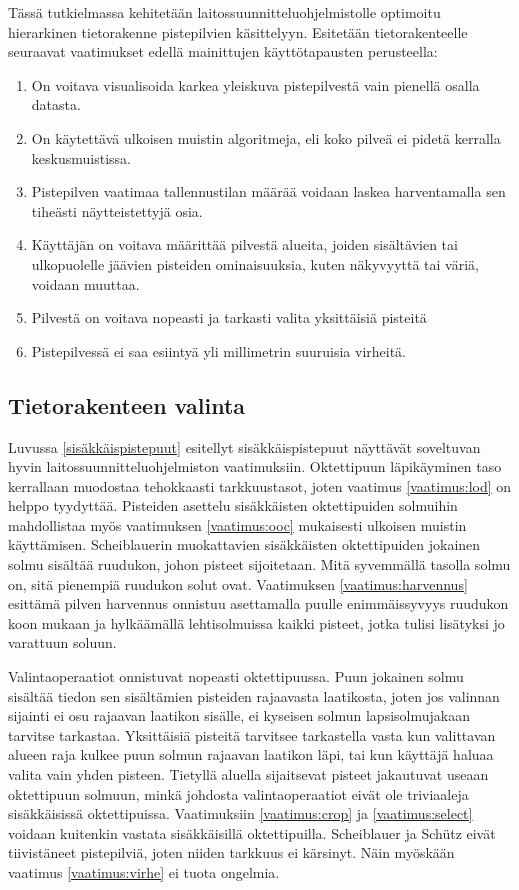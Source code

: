 Tässä tutkielmassa kehitetään laitossuunnitteluohjelmistolle optimoitu hierarkinen tietorakenne pistepilvien käsittelyyn. Esitetään tietorakenteelle seuraavat vaatimukset edellä mainittujen käyttötapausten perusteella:
\begin{enumerate}
    \item \label{vaatimus:lod} On voitava visualisoida karkea yleiskuva pistepilvestä vain pienellä osalla datasta. 
    \item \label{vaatimus:ooc} On käytettävä ulkoisen muistin algoritmeja, eli koko pilveä ei pidetä kerralla keskusmuistissa.
    \item \label{vaatimus:harvennus} Pistepilven vaatimaa tallennustilan määrää voidaan laskea harventamalla sen tiheästi näytteistettyjä osia. 
    \item \label{vaatimus:crop} Käyttäjän on voitava määrittää pilvestä alueita, joiden sisältävien tai ulkopuolelle jäävien pisteiden ominaisuuksia, kuten näkyvyyttä tai väriä, voidaan muuttaa.
    \item \label{vaatimus:select} Pilvestä on voitava nopeasti ja tarkasti valita yksittäisiä pisteitä
    \item \label{vaatimus:virhe} Pistepilvessä ei saa esiintyä yli millimetrin suuruisia virheitä.
\end{enumerate}


\subsection{Tietorakenteen valinta}

Luvussa \ref{sisäkkäispistepuut} esitellyt sisäkkäispistepuut näyttävät soveltuvan hyvin laitossuunnitteluohjelmiston vaatimuksiin. Oktettipuun läpikäyminen taso kerrallaan muodostaa tehokkaasti tarkkuustasot, joten vaatimus \ref{vaatimus:lod} on helppo tyydyttää. Pisteiden asettelu sisäkkäisten oktettipuiden solmuihin mahdollistaa myös vaatimuksen \ref{vaatimus:ooc} mukaisesti ulkoisen muistin käyttämisen. Scheiblauerin muokattavien sisäkkäisten oktettipuiden jokainen solmu sisältää ruudukon, johon pisteet sijoitetaan. Mitä syvemmällä tasolla solmu on, sitä pienempiä ruudukon solut ovat. Vaatimuksen \ref{vaatimus:harvennus} esittämä pilven harvennus onnistuu asettamalla puulle enimmäissyvyys ruudukon koon mukaan ja hylkäämällä lehtisolmuissa kaikki pisteet, jotka tulisi lisätyksi jo varattuun soluun. 

Valintaoperaatiot onnistuvat nopeasti oktettipuussa. Puun jokainen solmu sisältää tiedon sen sisältämien pisteiden rajaavasta laatikosta, joten jos valinnan sijainti ei osu rajaavan laatikon sisälle, ei kyseisen solmun lapsisolmujakaan tarvitse tarkastaa. Yksittäisiä pisteitä tarvitsee tarkastella vasta kun valittavan alueen raja kulkee puun solmun rajaavan laatikon läpi, tai kun käyttäjä haluaa valita vain yhden pisteen. Tietyllä aluella sijaitsevat pisteet jakautuvat useaan oktettipuun solmuun, minkä johdosta valintaoperaatiot eivät ole triviaaleja sisäkkäisissä oktettipuissa. Vaatimuksiin \ref{vaatimus:crop} ja \ref{vaatimus:select} voidaan kuitenkin vastata sisäkkäisillä oktettipuilla. Scheiblauer ja Schütz eivät tiivistäneet pistepilviä, joten niiden tarkkuus ei kärsinyt. Näin myöskään vaatimus \ref{vaatimus:virhe} ei tuota ongelmia.


